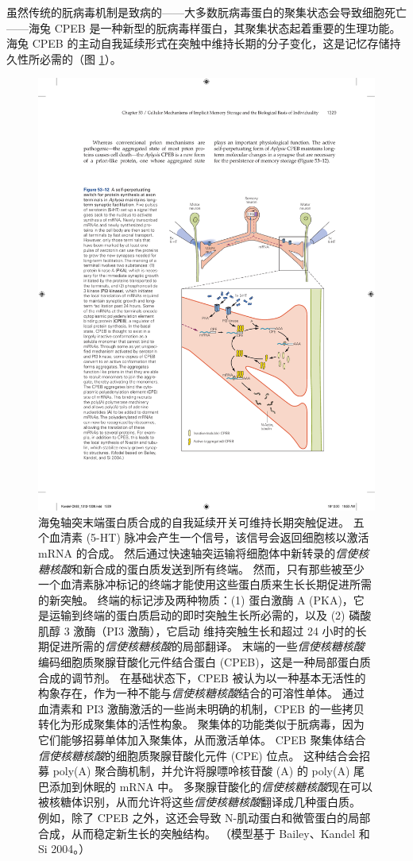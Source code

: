 虽然传统的朊病毒机制是致病的——大多数朊病毒蛋白的聚集状态会导致细胞死亡——海兔 CPEB 是一种新型的朊病毒样蛋白，其聚集状态起着重要的生理功能。
海兔 CPEB 的主动自我延续形式在突触中维持长期的分子变化，这是记忆存储持久性所必需的（图 \ref{fig:53_12}）。


\begin{figure}[htbp]
	\centering
	\includegraphics[width=0.7\linewidth]{chap53/fig_53_12}
	\caption{海兔轴突末端蛋白质合成的自我延续开关可维持长期突触促进。 五个血清素 (5-HT) 脉冲会产生一个信号，该信号会返回细胞核以激活 mRNA 的合成。 然后通过快速轴突运输将细胞体中新转录的\textit{信使核糖核酸}和新合成的蛋白质发送到所有终端。 然而，只有那些被至少一个血清素脉冲标记的终端才能使用这些蛋白质来生长长期促进所需的新突触。 终端的标记涉及两种物质：(1) 蛋白激酶 A (PKA)，它是运输到终端的蛋白质启动的即时突触生长所必需的，以及 (2) 磷酸肌醇 3 激酶（PI3 激酶），它启动 维持突触生长和超过 24 小时的长期促进所需的\textit{信使核糖核酸}的局部翻译。 末端的一些\textit{信使核糖核酸}编码细胞质聚腺苷酸化元件结合蛋白 (CPEB)，这是一种局部蛋白质合成的调节剂。 在基础状态下，CPEB 被认为以一种基本无活性的构象存在，作为一种不能与\textit{信使核糖核酸}结合的可溶性单体。 通过血清素和 PI3 激酶激活的一些尚未明确的机制，CPEB 的一些拷贝转化为形成聚集体的活性构象。 聚集体的功能类似于朊病毒，因为它们能够招募单体加入聚集体，从而激活单体。 CPEB 聚集体结合\textit{信使核糖核酸}的细胞质聚腺苷酸化元件 (CPE) 位点。 这种结合会招募 poly(A) 聚合酶机制，并允许将腺嘌呤核苷酸 (A) 的 poly(A) 尾巴添加到休眠的 mRNA 中。 多聚腺苷酸化的\textit{信使核糖核酸}现在可以被核糖体识别，从而允许将这些\textit{信使核糖核酸}翻译成几种蛋白质。 例如，除了 CPEB 之外，这还会导致 N-肌动蛋白和微管蛋白的局部合成，从而稳定新生长的突触结构。 （模型基于 Bailey、Kandel 和 Si 2004。）}
	\label{fig:53_12}
\end{figure}


